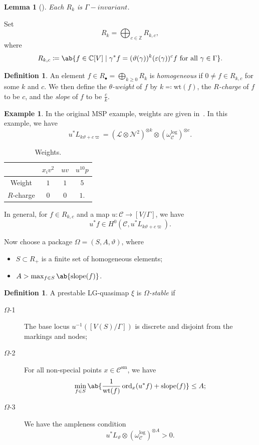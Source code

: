 \documentclass[10pt]{amsart}
\newtheorem{lem}[thm]{Lemma}
\theoremstyle{definition}
\newtheorem{defn}[thm]{Definition}
\newtheorem{exm}[thm]{Example}
\theoremstyle{remark}
\theoremstyle{plain}
\theoremstyle{definition}
\theoremstyle{remark}
\newcommand{\C}{\mathbb{C}}
\newcommand{\Z}{\mathbb{Z}}
\newcommand{\ep}{\varepsilon}
\newcommand{\mc}[1]{\mathcal{#1}}
\newcommand{\mr}[1]{\mathrm{#1}}
\newcommand{\on}[1]{\operatorname{#1}}
\newcommand{\1}{\mathbf{1}}
\newcommand{\2}{\mathbf{2}}
\newcommand{\3}{\mathbf{3}}
\begin{document}
\begin{lem}[\cite{glsm}]
    Each $R_k$ is $\Gamma-invariant$. 
\end{lem}
Set
\[ R_k = \bigoplus_{c \in \Z} R_{k,c}, \]
where
\[ R_{k,c} \coloneqq \ab\{ f \in \C[V] \mid \gamma^* f = (\vartheta(\gamma))^k (\ep(\gamma))^c f \text{ for all }\gamma \in \Gamma \}. \]

\begin{defn}
    An element $f \in R_{\bullet} = \bigoplus_{k \geq 0} R_k$ is \textit{homogeneous} if $0 \neq f \in R_{k,c}$ for some $k$ and $c$. We then define the \textit{$\theta$-weight} of $f$ by $k \eqqcolon \mr{wt}(f)$, the \textit{$R$-charge} of $f$ to be $c$, and the \textit{slope} of $f$ to be $\frac{c}{k}$.
\end{defn}

\begin{exm}
    In the original MSP example, weights are given in~.
    In this example, we have
    \[ u^* L_{k\vartheta+c\varpi} = (\mc{L} \otimes \mc{N}^2)^{\otimes k} \otimes (\omega_{\mc{C}}^{\log})^{\otimes c}. \]
    \begin{table}[htpb]
        \centering
        \caption{Weights.}
        \label{tab:weights}
        \begin{tabular}{cccc}
            \toprule
            & $x_i v^2$ & $uv$ & $u^{10} p$ \\
            \midrule
            Weight & $1$ & $1$ & $5$ \\
            $R$-charge & $0$ & $0$ & $1$.\\
            \bottomrule
        \end{tabular}
    \end{table}
\end{exm}

In general, for $f \in R_{k,c}$ and a map $u \colon \mc{C} \to [V/\Gamma]$, we have
\[ u^* f \in H^0(\mc{C}, u^*L_{k\vartheta + c\varpi}). \]

Now choose a package $\Omega = (S,A,\vartheta)$, where
\begin{itemize}
    \item $S \subset R_+$ is a finite set of homogeneous elements;
    \item $A > \max_{f \in S} \ab\{\on{slope}(f) \}$.
\end{itemize}

\begin{defn}
    A prestable LG-quasimap $\xi$ is \textit{$\Omega$-stable} if
    \begin{description}
        \item[$\Omega$-1] The base locus $u^{-1}( [ V(S)/\Gamma] )$ is discrete and disjoint from the markings and nodes;
        \item[$\Omega$-2] For all non-special points $x \in \mc{C}^{\mr{sm}}$, we have
            \[ \min_{f \in S} \ab\{ \frac{1}{\mr{wt}(f)} \on{ord}_x (u^* f) + \on{slope}(f)\} \leq A; \]
        \item[$\Omega$-3] We have the ampleness condition
            \[ u^* L_{\vartheta} \otimes (\omega_{\mc{C}}^{\log})^{\otimes A} > 0. \]
    \end{description}
\end{defn}
\end{document}
